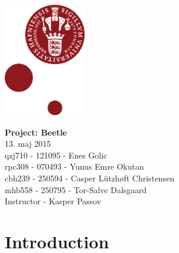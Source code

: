 \documentclass[12pt,a4paper]{article}
\begin{document}
	
	\begin{minipage}[b]{1.0\linewidth} 
				\includegraphics[height=50mm]{KULogo.pdf}
		
		\vspace*{-16ex}
		\vspace {35ex}
		\begin{center}
			{\huge \bf Project: Beetle} \vspace*{4ex} \\
			{\large 13. maj 2015}\\
			\vspace*{2ex}
			qzj710 - 121095 - Enes Golic \\
			rpc308 - 070493 - Yunus Emre Okutan \\
			cbh239 - 250594 - Casper Lützhøft Christensen \\
			mhb558 - 250795 - Tor-Salve Dalsgaard\\
			\vspace*{1ex}
			Instructor - Kasper Passov
			
		\end{center}
	\end{minipage}
	
\newpage
\tableofcontents

\newpage
\section{Introduction}
\end{document}
